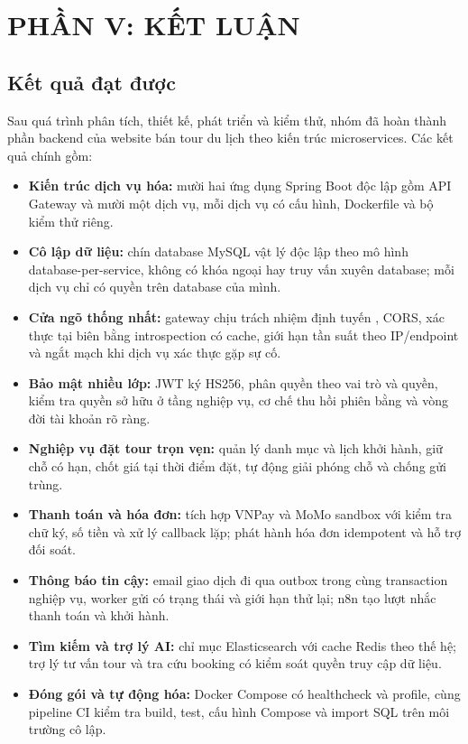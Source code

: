 \chapter{PHẦN V: KẾT LUẬN}
\label{chap:ket-luan}

\section{Kết quả đạt được}
\label{sec:ket-qua-dat-duoc}

Sau quá trình phân tích, thiết kế, phát triển và kiểm thử, nhóm đã hoàn thành phần backend của website bán tour du lịch theo kiến trúc microservices. Các kết quả chính gồm:

\begin{itemize}
  \item \textbf{Kiến trúc dịch vụ hóa:} mười hai ứng dụng Spring Boot độc lập gồm API Gateway và mười một dịch vụ, mỗi dịch vụ có cấu hình, Dockerfile và bộ kiểm thử riêng.
  \item \textbf{Cô lập dữ liệu:} chín database MySQL vật lý độc lập theo mô hình database-per-service, không có khóa ngoại hay truy vấn xuyên database; mỗi dịch vụ chỉ có quyền trên database của mình.
  \item \textbf{Cửa ngõ thống nhất:} gateway chịu trách nhiệm định tuyến , CORS, xác thực tại biên bằng introspection có cache, giới hạn tần suất theo IP/endpoint và ngắt mạch khi dịch vụ xác thực gặp sự cố.
  \item \textbf{Bảo mật nhiều lớp:} JWT ký HS256, phân quyền theo vai trò và quyền, kiểm tra quyền sở hữu ở tầng nghiệp vụ, cơ chế thu hồi phiên bằng  và vòng đời tài khoản rõ ràng.
  \item \textbf{Nghiệp vụ đặt tour trọn vẹn:} quản lý danh mục và lịch khởi hành, giữ chỗ có hạn, chốt giá tại thời điểm đặt, tự động giải phóng chỗ và chống gửi trùng.
  \item \textbf{Thanh toán và hóa đơn:} tích hợp VNPay và MoMo sandbox với kiểm tra chữ ký, số tiền và xử lý callback lặp; phát hành hóa đơn idempotent và hỗ trợ đối soát.
  \item \textbf{Thông báo tin cậy:} email giao dịch đi qua outbox trong cùng transaction nghiệp vụ, worker gửi có trạng thái và giới hạn thử lại; n8n tạo lượt nhắc thanh toán và khởi hành.
  \item \textbf{Tìm kiếm và trợ lý AI:} chỉ mục Elasticsearch với cache Redis theo thế hệ; trợ lý tư vấn tour và tra cứu booking có kiểm soát quyền truy cập dữ liệu.
  \item \textbf{Đóng gói và tự động hóa:} Docker Compose có healthcheck và profile, cùng pipeline CI kiểm tra build, test, cấu hình Compose và import SQL trên môi trường cô lập.
\end{itemize}

